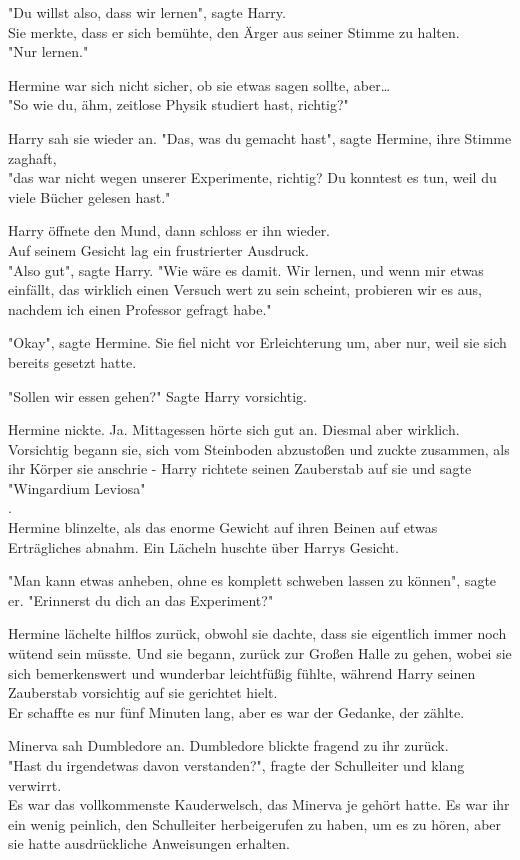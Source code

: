 {"Du willst also, dass wir lernen", sagte Harry.\\ Sie merkte, dass er sich bemühte, den Ärger aus seiner Stimme zu halten.\\ "Nur lernen."

Hermine war sich nicht sicher, ob sie etwas sagen sollte, aber…\\ "So wie du, ähm, zeitlose Physik studiert hast, richtig?"

Harry sah sie wieder an. "Das, was du gemacht hast", sagte Hermine, ihre Stimme zaghaft,\\ "das war nicht wegen unserer Experimente, richtig? Du konntest es tun, weil du viele Bücher gelesen hast."

Harry öffnete den Mund, dann schloss er ihn wieder.\\ Auf seinem Gesicht lag ein frustrierter Ausdruck.\\ "Also gut", sagte Harry. "Wie wäre es damit. Wir lernen, und wenn mir etwas einfällt, das wirklich einen Versuch wert zu sein scheint, probieren wir es aus, nachdem ich einen Professor gefragt habe."

"Okay", sagte Hermine. Sie fiel nicht vor Erleichterung um, aber nur, weil sie sich bereits gesetzt hatte.

"Sollen wir essen gehen?" Sagte Harry vorsichtig.

Hermine nickte. Ja. Mittagessen hörte sich gut an. Diesmal aber wirklich. Vorsichtig begann sie, sich vom Steinboden abzustoßen und zuckte zusammen, als ihr Körper sie anschrie - Harry richtete seinen Zauberstab auf sie und sagte "Wingardium Leviosa"\\ .\\ Hermine blinzelte, als das enorme Gewicht auf ihren Beinen auf etwas Erträgliches abnahm. Ein Lächeln huschte über Harrys Gesicht.

"Man kann etwas anheben, ohne es komplett schweben lassen zu können", sagte er. "Erinnerst du dich an das Experiment?"

Hermine lächelte hilflos zurück, obwohl sie dachte, dass sie eigentlich immer noch wütend sein müsste. Und sie begann, zurück zur Großen Halle zu gehen, wobei sie sich bemerkenswert und wunderbar leichtfüßig fühlte, während Harry seinen Zauberstab vorsichtig auf sie gerichtet hielt.\\ Er schaffte es nur fünf Minuten lang, aber es war der Gedanke, der zählte.

Minerva sah Dumbledore an. Dumbledore blickte fragend zu ihr zurück.\\ "Hast du irgendetwas davon verstanden?", fragte der Schulleiter und klang verwirrt.\\ Es war das vollkommenste Kauderwelsch, das Minerva je gehört hatte. Es war ihr ein wenig peinlich, den Schulleiter herbeigerufen zu haben, um es zu hören, aber sie hatte ausdrückliche Anweisungen erhalten.

}
